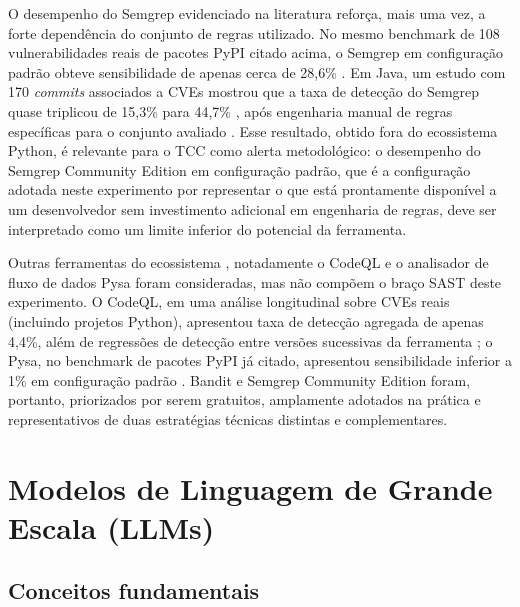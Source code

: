 O desempenho do Semgrep evidenciado na literatura reforça, mais uma vez, a forte dependência do conjunto de regras utilizado. No mesmo benchmark de 108 vulnerabilidades reais de pacotes PyPI citado acima, o Semgrep em configuração padrão obteve sensibilidade de apenas cerca de 28,6\% \cite{Marquer2026SAGA}. Em Java, um estudo com 170 \textit{commits} associados a CVEs mostrou que a taxa de detecção do Semgrep quase triplicou de 15,3\% para 44,7\% , após engenharia manual de regras específicas para o conjunto avaliado \cite{Bennett2024Semgrep}. Esse resultado, obtido fora do ecossistema Python, é relevante para o TCC como alerta metodológico: o desempenho do Semgrep Community Edition em configuração padrão, que é a configuração adotada neste experimento por representar o que está prontamente disponível a um desenvolvedor sem investimento adicional em engenharia de regras, deve ser interpretado como um limite inferior do potencial da ferramenta.

Outras ferramentas do ecossistema , notadamente o CodeQL e o analisador de fluxo de dados Pysa  foram consideradas, mas não compõem o braço SAST deste experimento. O CodeQL, em uma análise longitudinal sobre CVEs reais (incluindo projetos Python), apresentou taxa de detecção agregada de apenas 4,4\%, além de regressões de detecção entre versões sucessivas da ferramenta \cite{Noirot2025CodeQLLongitudinal}; o Pysa, no benchmark de pacotes PyPI já citado, apresentou sensibilidade inferior a 1\% em configuração padrão \cite{Marquer2026SAGA}. Bandit e Semgrep Community Edition foram, portanto, priorizados por serem gratuitos, amplamente adotados na prática e representativos de duas estratégias técnicas distintas e complementares.


\section{Modelos de Linguagem de Grande Escala (LLMs)}\label{sec:llms}
\subsection{Conceitos fundamentais}\label{subsec:llms-conceitos}

